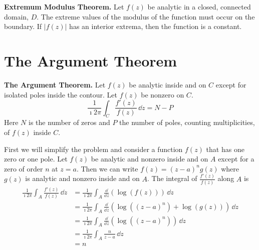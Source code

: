 \begin{Result}
  \label{extremum_modulus_theorem}
  \textbf{Extremum Modulus Theorem.}
  Let $f(z)$ be analytic in a closed, connected domain, $D$.  The
  extreme values of the modulus of the function must occur on the
  boundary.  If $|f(z)|$ has an interior extrema, then the function
  is a constant.
\end{Result}













\section{The Argument Theorem}



\begin{Result}
  \label{res_argument_theorem}
  \textbf{The Argument Theorem.}
  Let $f(z)$ be analytic inside and on $C$ except for isolated poles inside
  the contour.  Let $f(z)$ be nonzero on $C$.
  \[
  \frac{1}{\imath 2 \pi} \int_C \frac{f'(z)}{f(z)}\,\dd z = N - P
  \]
  Here $N$ is the number of zeros and $P$ the number of poles,
  counting multiplicities, of $f(z)$ inside $C$.
\end{Result}


First we will simplify the problem and consider a function $f(z)$ that has 
one zero or one pole.
Let $f(z)$ be analytic and nonzero inside and on $A$ except for a zero of 
order $n$ at $z = a$.  Then we can write $f(z) = (z-a)^n g(z)$ where $g(z)$ is 
analytic and nonzero inside and on $A$.  The integral of $\frac{f'(z)}{f(z)}$
along $A$ is
\begin{align*}
  \frac{1}{\imath 2 \pi} \int_A \frac{f'(z)}{f(z)}\,\dd z
  &= \frac{1}{\imath 2 \pi} \int_A \frac{\dd}{\dd z} \left( \log(f(z)) \right)\,\dd z
  \\
  &= \frac{1}{\imath 2 \pi} \int_A \frac{\dd}{\dd z} \left( \log((z - a)^n) + 
    \log(g(z)) \right)\,\dd z 
  \\
  &= \frac{1}{\imath 2 \pi} \int_A \frac{\dd}{\dd z} \left( \log((z - a)^n) 
  \right)\,\dd z 
  \\
  &= \frac{1}{\imath 2 \pi} \int_A \frac{n}{z - a} \,\dd z 
  \\
  &= n
\end{align*}

